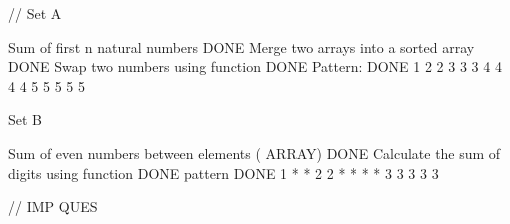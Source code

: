 // Set  A

Sum of first n natural numbers                                                                     DONE
Merge two arrays into a sorted array                                                               DONE
Swap two numbers using function                                                                    DONE
Pattern:                                                                                           DONE                                                                           
1
2 2
3 3 3
4 4 4 4
5 5 5 5 5

 Set  B

Sum of even numbers between elements   ( ARRAY)                                                    DONE
Calculate the sum of digits using function                                                         DONE
pattern                                                                                            DONE
1
* *
2 2
* * * *
3 3 3 3 3


// IMP QUES

